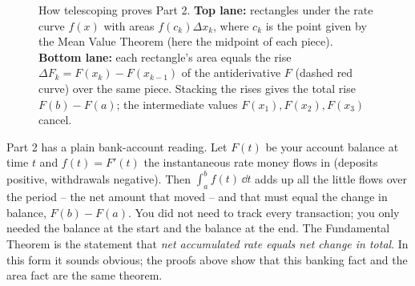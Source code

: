 \begin{figure}[H]
\caption{How telescoping proves Part 2. \textbf{Top lane:} rectangles under the rate curve $f(x)$ with areas $f(c_k)\Delta x_k$, where $c_k$ is the point given by the Mean Value Theorem (here the midpoint of each piece). \textbf{Bottom lane:} each rectangle's area equals the rise $\Delta F_k = F(x_k)-F(x_{k-1})$ of the antiderivative $F$ (dashed red curve) over the same piece. Stacking the rises gives the total rise $F(b)-F(a)$; the intermediate values $F(x_1),F(x_2),F(x_3)$ cancel.}
\label{ch21:fig-telescoping}
\end{figure}

\begin{happeningbox}
Part 2 has a plain bank-account reading. Let $F(t)$ be your
account balance at time $t$ and $f(t)=F'(t)$ the instantaneous rate money flows
in (deposits positive, withdrawals negative). Then $\int_a^b f(t)\,\dd t$ adds up
all the little flows over the period -- the net amount that moved -- and that must
equal the change in balance, $F(b)-F(a)$. You did not need to track every
transaction; you only needed the balance at the start and the balance at the end.
The Fundamental Theorem is the statement that \emph{net accumulated rate equals
net change in total}. In this form it sounds obvious; the proofs above show
that this banking fact and the area fact are the same theorem.
\end{happeningbox}

